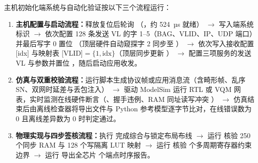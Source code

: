 主机初始化端系统与自动化验证按以下三个流程运行：
\begin{enumerate}[leftmargin=2em,itemsep=1pt]
  \item \textbf{主机配置与启动流程：}释放复位后轮询 （，约 524~µs 就绪） $\rightarrow$ 写入端系统标识  $\rightarrow$ 依次配置 128 条发送 VL 的字 1--5（BAG、VLID、IP、UDP 端口）并最后写字 0 置位 （顶层硬件自动窥探字 2 同步至 ） $\rightarrow$ 依次写入接收配置 [idx] 与映射表 [VLID]$=\{1,\text{idx}\}$（顶层同步更新 ） $\rightarrow$ 配置三项服务的发送 VL 与参数并置位 ，随后启动应用收发。
  \item \textbf{仿真与双重校验流程：}运行脚本生成协议帧或应用消息流（含畸形帧、乱序 SN、双网时延差与丢包注入） $\rightarrow$ 驱动 ModelSim 运行 RTL 或 VQM 网表，实时监测在线硬件断言（、握手违例、RAM 同址读写冲突 ） $\rightarrow$ 仿真结束后由离线检查器将导出文件与 Python 参考模型逐字节比对，在线错误数为 0 且离线差异数为 0 时判定通过。
  \item \textbf{物理实现与四步签核流程：}执行  完成综合与锁定布局布线 $\rightarrow$ 运行  核验 250 个同步 RAM 与 128 个写隔离 LUT 映射 $\rightarrow$ 运行  核验 \countsep{\MulticycleRegs} 个多周期寄存器约束边界 $\rightarrow$ 运行  导出全芯片 \countsep{\RoutedEndpoints} 个端点时序报告。
\end{enumerate}
